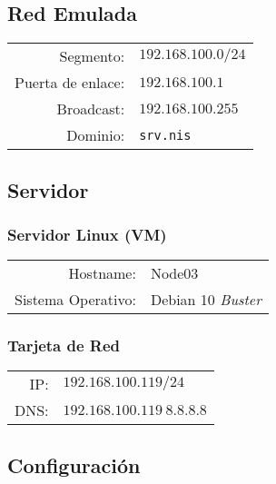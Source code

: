 \documentclass[../main.tex]{subfiles}
\begin{document}
\subsection{Red Emulada}\label{sec:red_emu}

\begin{table}[H]
  \centering
  \begin{tabular}{rl}
    
    Segmento:&$192.168.100.0/24$\\
    Puerta de enlace:&$192.168.100.1$\\
    Broadcast:&$192.168.100.255$\\
    Dominio:&\texttt{srv.nis}\\
  \end{tabular}
\end{table}

\subsection{Servidor}\label{sec:servidor}

\subsubsection{Servidor Linux (VM)}\label{sec:slvm}


\begin{table}[H]
  \centering
  \begin{tabular}{rl}
    
    Hostname: &Node03\\
    Sistema Operativo: & Debian 10 \textit{Buster}\\
  \end{tabular}
\end{table}

\subsubsection{Tarjeta de Red}\label{sec:tr}

\begin{table}[H]
  \centering
  \begin{tabular}{rl}
    
    IP:&$192.168.100.119/24$\\
    DNS:&$192.168.100.119\ 8.8.8.8$\\
  \end{tabular}
\end{table}

\subsection{Configuración}\label{sec:serv_conf}
\end{document}
